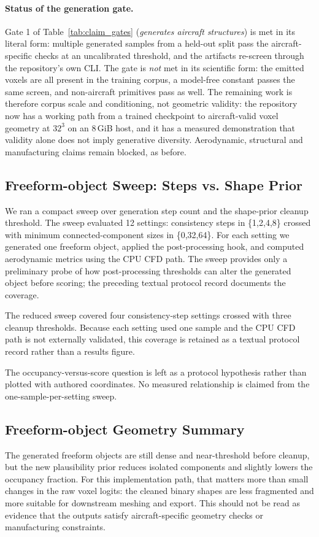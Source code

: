 \paragraph{Status of the generation gate.}
Gate 1 of Table~\ref{tab:claim_gates} (\emph{generates aircraft structures}) is met in
its literal form: multiple generated samples from a held-out split pass the
aircraft-specific checks at an uncalibrated threshold, and the artifacts re-screen
through the repository's own CLI. The gate is \emph{not} met in its scientific form:
the emitted voxels are all present in the training corpus, a model-free constant passes
the same screen, and non-aircraft primitives pass as well. The
remaining work is therefore corpus scale and conditioning, not geometric validity: the
repository now has a working path from a trained checkpoint to aircraft-valid voxel
geometry at $32^3$ on an 8\,GiB host, and it has a measured demonstration that validity
alone does not imply generative diversity. Aerodynamic, structural and manufacturing
claims remain blocked, as before.

\subsection{Freeform-object Sweep: Steps vs. Shape Prior}
We ran a compact sweep over generation step count and the shape-prior cleanup threshold. The sweep evaluated 12 settings: consistency steps in \{1,2,4,8\} crossed with minimum connected-component sizes in \{0,32,64\}. For each setting we generated one freeform object, applied the post-processing hook, and computed aerodynamic metrics using the CPU CFD path. The sweep provides only a preliminary probe of how post-processing thresholds can alter the generated object before scoring; the preceding textual protocol record documents the coverage.

The reduced sweep covered four consistency-step settings crossed with three cleanup thresholds. Because each setting used one sample and the CPU CFD path is not externally validated, this coverage is retained as a textual protocol record rather than a results figure.

The occupancy-versus-score question is left as a protocol hypothesis rather than plotted with authored coordinates. No measured relationship is claimed from the one-sample-per-setting sweep.

\subsection{Freeform-object Geometry Summary}
The generated freeform objects are still dense and near-threshold before cleanup, but the new plausibility prior reduces isolated components and slightly lowers the occupancy fraction. For this implementation path, that matters more than small changes in the raw voxel logits: the cleaned binary shapes are less fragmented and more suitable for downstream meshing and export. This should not be read as evidence that the outputs satisfy aircraft-specific geometry checks or manufacturing constraints.

